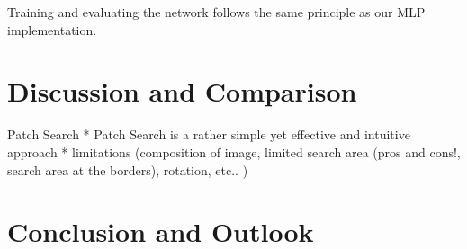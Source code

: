 \documentclass[]{article}
\newenvironment{Shaded}{\begin{snugshade}}{\end{snugshade}}
\newcommand{\KeywordTok}[1]{\textcolor[rgb]{0.13,0.29,0.53}{\textbf{{#1}}}}
\newcommand{\StringTok}[1]{\textcolor[rgb]{0.31,0.60,0.02}{{#1}}}
\newcommand{\NormalTok}[1]{{#1}}
\begin{document}
\begin{Shaded}
\end{Shaded}

Training and evaluating the network follows the same principle as our
MLP implementation.

\section{Discussion and Comparison}\label{discussion-and-comparison}

Patch Search * Patch Search is a rather simple yet effective and
intuitive approach * limitations (composition of image, limited search
area (pros and cons!, search area at the borders), rotation, etc.. )

\section{Conclusion and Outlook}\label{conclusion-and-outlook}
\end{document}
